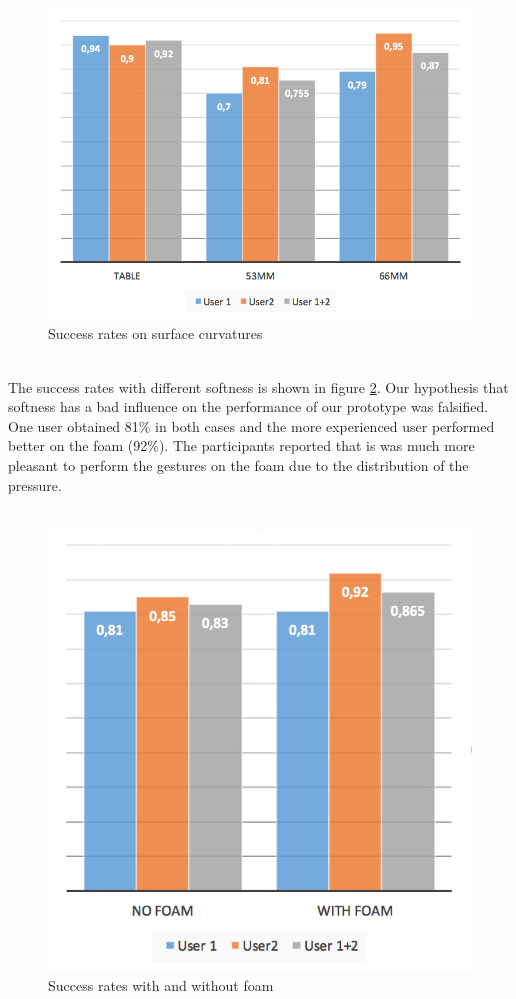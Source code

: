 \begin{figure}
\includegraphics[scale=0.35]{images/surface.jpg}
\caption{Success rates on surface curvatures}
\label{fig:surface}
\end{figure}
\\
The success rates with different softness is shown in figure \ref{fig:foam}. Our hypothesis  that softness has a bad influence on the performance of our prototype was falsified. One user obtained 81\%  in both cases and the more experienced user performed better on the foam (92\%). The participants reported that is was much more pleasant to perform the gestures on the foam due to the distribution of the pressure. 
\\ \\
\begin{center}
\begin{figure}
\includegraphics[scale=0.5]{images/foam.jpg}
\caption{Success rates with and without foam}
\label{fig:foam}
\end{figure}
\end{center}

